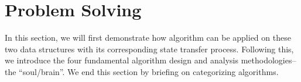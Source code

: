 \documentclass[../main.tex]{subfiles}
\begin{document}






\section{Problem Solving}
\label{sec_problem_solving}
In this section, we will first demonstrate how algorithm can be applied on these two data structures with its corresponding state transfer process. Following this, we introduce the four fundamental algorithm design and analysis methodologies--the ``soul/brain''.
 We end this section by briefing on categorizing algorithms. 
 
\end{document}
